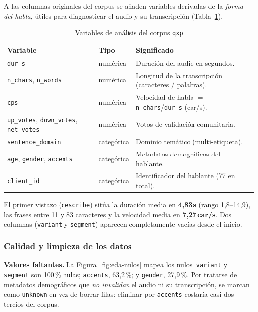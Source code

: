 A las columnas originales del corpus se a{\~n}aden variables derivadas de la \emph{forma del
habla}, {\'u}tiles para diagnosticar el audio y su transcripci{\'o}n
(Tabla~\ref{tab:eda-variables}).

\begin{table}[H]
  \centering
  \caption{Variables de an\'alisis del corpus \texttt{qxp}}
  \label{tab:eda-variables}
  \small
  \begin{tabularx}{\linewidth}{@{}l l X@{}}
    \toprule
    Variable & Tipo & Significado \\
    \midrule
    \texttt{dur\_s} & num\'erica & Duraci\'on del audio en segundos. \\
    \texttt{n\_chars}, \texttt{n\_words} & num\'erica & Longitud de la transcripci\'on (caracteres / palabras). \\
    \texttt{cps} & num\'erica & Velocidad de habla $=$ \texttt{n\_chars}/\texttt{dur\_s} (car/s). \\
    \texttt{up\_votes}, \texttt{down\_votes}, \texttt{net\_votes} & num\'erica & Votos de validaci\'on comunitaria. \\
    \texttt{sentence\_domain} & categ\'orica & Dominio tem\'atico (multi-etiqueta). \\
    \texttt{age}, \texttt{gender}, \texttt{accents} & categ\'orica & Metadatos demogr\'aficos del hablante. \\
    \texttt{client\_id} & categ\'orica & Identificador del hablante (77 en total). \\
    \bottomrule
  \end{tabularx}
\end{table}

El primer vistazo (\texttt{describe}) sit{\'u}a la duraci{\'o}n media en \textbf{4,83\,s}
(rango 1,8--14,9), las frases entre 11 y 83 caracteres y la velocidad media en
\textbf{7,27\,car/s}. Dos columnas (\texttt{variant} y \texttt{segment}) aparecen
completamente vac{\'i}as desde el inicio.

\subsubsection{Calidad y limpieza de los datos}
\label{sec:eda-calidad}

\textbf{Valores faltantes.} La Figura~\ref{fig:eda-nulos} mapea los nulos: \texttt{variant}
y \texttt{segment} son 100\,\% nulas; \texttt{accents}, 63,2\,\%; y \texttt{gender},
27,9\,\%. Por tratarse de metadatos demogr{\'a}ficos que \emph{no invalidan} el audio ni su
transcripci{\'o}n, se marcan como \texttt{unknown} en vez de borrar filas: eliminar por
\texttt{accents} costar{\'i}a casi dos tercios del corpus.

